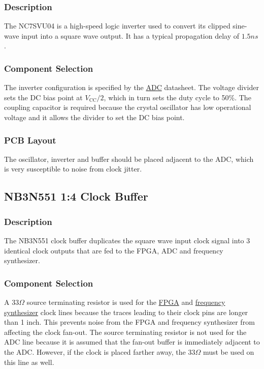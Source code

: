 \subsubsection{Description}
\label{sec:nc7svu04-description}

The NC7SVU04 is a high-speed logic inverter used to convert its clipped sine-wave input into a
square wave output. It has a typical propagation delay of $1.5 \si{ns}$.

\subsubsection{Component Selection}
\label{sec:nc7svu04-component-selection}

The inverter configuration is specified by the \hyperref[sec:ltc2292]{ADC} datasheet. The voltage
divider sets the DC bias point at $V_{\text{CC}}/2$, which in turn sets the duty cycle to 50\%. The
coupling capacitor is required because the crystal oscillator has low operational voltage and it
allows the divider to set the DC bias point.

\subsubsection{PCB Layout}
\label{sec:nc7svu04-pcb}

The oscillator, inverter and buffer should be placed adjacent to the ADC, which is very susceptible
to noise from clock jitter.

\subsection{NB3N551 1:4 Clock Buffer}
\label{sec:nb3n551}

\subsubsection{Description}
\label{sec:nb3n551-description}

The NB3N551 clock buffer duplicates the square wave input clock signal into 3 identical clock
outputs that are fed to the FPGA, ADC and frequency synthesizer.

\subsubsection{Component Selection}
\label{sec:nb3n551-component-selection}

A $33 \si{\Omega}$ source terminating resistor is used for the \hyperref[sec:xc7a15t-ftg256]{FPGA}
and \hyperref[sec:adf4158]{frequency synthesizer} clock lines because the traces leading to their
clock pins are longer than 1 inch. This prevents noise from the FPGA and frequency synthesizer from
affecting the clock fan-out. The source terminating resistor is not used for the ADC line because it
is assumed that the fan-out buffer is immediately adjacent to the ADC\@. However, if the clock is
placed farther away, the $33 \si{\Omega}$ must be used on this line as well.

